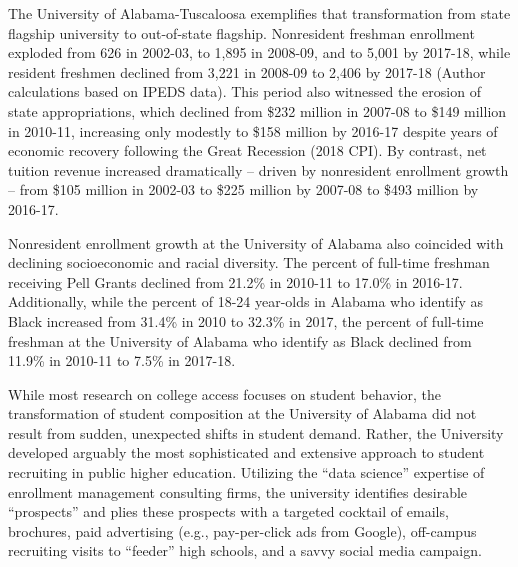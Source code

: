 \documentclass[twoside]{article}
\begin{document}
The University of Alabama-Tuscaloosa exemplifies that transformation from state flagship university to out-of-state flagship.  Nonresident freshman enrollment exploded from 626 in 2002-03, to 1,895 in 2008-09, and to 5,001 by 2017-18, while resident freshmen declined from 3,221 in 2008-09 to 2,406 by 2017-18 (Author calculations based on IPEDS data). This period also witnessed the erosion of state appropriations, which declined from \$232 million in 2007-08 to \$149 million in 2010-11, increasing only modestly to \$158 million by 2016-17 despite years of economic recovery following the Great Recession  (2018 CPI).  By contrast, net tuition revenue increased dramatically -- driven by nonresident enrollment growth -- from \$105 million in 2002-03 to \$225 million by 2007-08 to \$493 million by 2016-17.

Nonresident enrollment growth at the University of Alabama also coincided with declining socioeconomic and racial diversity.  The percent of full-time freshman receiving Pell Grants declined from 21.2\% in 2010-11 to 17.0\% in 2016-17.  Additionally, while the percent of 18-24 year-olds in Alabama who identify as Black increased from 31.4\% in 2010 to 32.3\% in 2017, the percent of full-time freshman at the University of Alabama who identify as Black declined from 11.9\% in 2010-11 to 7.5\% in 2017-18.

While most research on college access focuses on student behavior, the transformation of student composition at the University of Alabama did not result from sudden, unexpected shifts in student demand. Rather, the University developed arguably the most sophisticated and extensive approach to student recruiting in public higher education.  Utilizing the ``data science'' expertise of enrollment management consulting firms, the university identifies desirable ``prospects'' and plies these prospects with a targeted cocktail of emails, brochures, paid advertising (e.g., pay-per-click ads from Google), off-campus recruiting visits to ``feeder'' high schools, and a savvy social media campaign.
\end{document}
